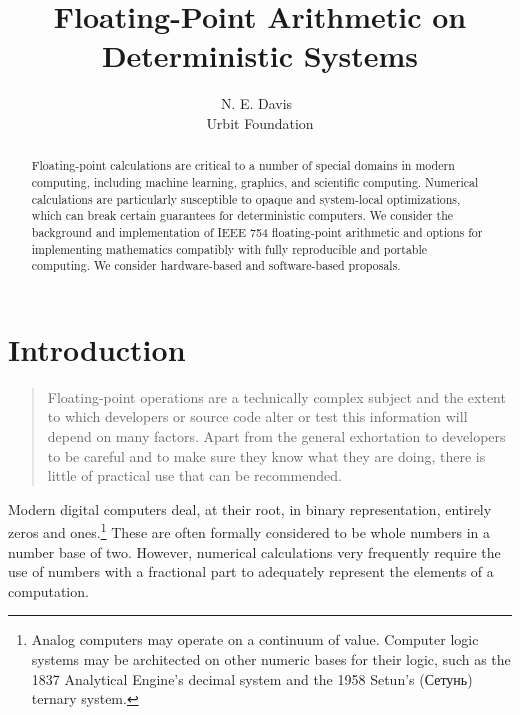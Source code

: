 \documentclass[twoside]{article}
\title{Floating-Point Arithmetic on Deterministic Systems}
\author{N. E. Davis~\patp{lagrev-nocfep} \\ Urbit Foundation}
\date{}
\begin{document}
\maketitle
\thispagestyle{firststyle}

\begin{abstract}
Floating-point calculations are critical to a number of special domains in modern computing, including machine learning, graphics, and scientific computing.  Numerical calculations are particularly susceptible to opaque and system-local optimizations, which can break certain guarantees for deterministic computers.  We consider the background and implementation of IEEE 754 floating-point arithmetic and options for implementing mathematics compatibly with fully reproducible and portable computing.  We consider hardware-based and software-based proposals.
\end{abstract}

\tableofcontents

\section{Introduction}

\begin{quote}
Floating-point operations are a technically complex subject and the extent to which developers or source code alter or test this information will depend on many factors. Apart from the general exhortation to developers to be careful and to make sure they know what they are doing, there is little of practical use that can be recommended.  \citep[p.~197]{Jones2008}
\end{quote}

Modern digital computers deal, at their root, in binary representation, entirely zeros and ones.\footnote{Analog computers may operate on a continuum of value.  Computer logic systems may be architected on other numeric bases for their logic, such as the 1837 Analytical Engine's decimal system and the 1958 Setun's (Сетунь) ternary system.}  These are often formally considered to be whole numbers in a number base of two.  However, numerical calculations very frequently require the use of numbers with a fractional part to adequately represent the elements of a computation.
\end{document}

